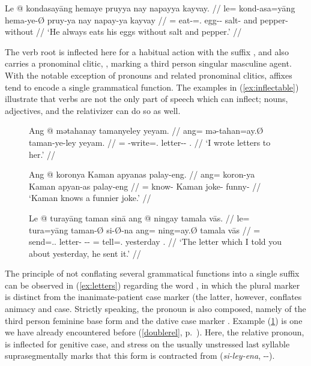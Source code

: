\ex\label{ex:suffixation}%
\begingl
	\gla Le @ kondasayāng hemaye pruyya nay napayya kayvay. //
	\glb le= kond-asa=yāng hema-ye-Ø pruy-ya nay napay-ya kayvay //
	\glc \PatTI{}= eat-\Hab{}=\TsgM{}.\Aarg{} egg-\Pl{}-\Top{} salt-\Loc{} 
		and pepper-\Loc{} without //
	\glft `He always eats his eggs without salt and pepper.' //
\endgl\xe

The verb root  is inflected here for a habitual action
with the suffix , and also carries a pronominal
clitic, , marking a third person singular
masculine agent. With the notable exception of pronouns and related pronominal
clitics, affixes tend to encode a single grammatical function. The examples in
(\ref{ex:inflectable}) illustrate that verbs are not the only part of speech
which can inflect; nouns, adjectives, and the relativizer can do
so as well.

\begin{figure}[h]
\pex\label{ex:inflectable}
\a\label{ex:letters}\begingl
	\gla Ang @ mətahanay tamanyeley yeyam. //
	\glb ang= mə-tahan=ay.Ø taman-ye-ley yeyam. //
	\glc \AgtT{}= \Pst{}-write=\Fsg{}.\Top{} letter-\Pl{}-\PargI{} 
		\TsgF{}.\Dat{} //
	\glft `I wrote letters to her.' //
\endgl

\a\label{ex:adjinfl}\begingl
	\gla Ang @ koronya Kaman apyanas palay-eng. //
	\glb ang= koron-ya Kaman apyan-as palay-eng //
	\glc \AgtT{}= know-\TsgM{} Kaman joke-\Parg{} funny-\Comp{} //
	\glft `Kaman knows a funnier joke.' //
\endgl

\a\label{ex:relative}\begingl
	\gla Le @ turayāng taman sinā ang @ ningay tamala vās. //
	\glb le= tura=yāng taman-Ø si-Ø-na ang= ning=ay.Ø tamala vās //
	\glc \PatTI{}= send=\Tsg{}.\M{}.\Aarg{} letter-\Top{} 
		\Rel{}-\PatTI{}-\Gen{} \AgtT{}= tell=\Fsg{}.\Top{} yesterday 
		\Ssg{}.\Parg{} //
	\glft `The letter which I told you about yesterday, he sent it.' //
\endgl
\xe
\end{figure}

The principle of not conflating several grammatical functions into a single
suffix can be observed in (\ref{ex:letters}) regarding the word
, in which the plural marker 
 is distinct from the inanimate-patient case marker 
 (the latter, however, conflates animacy and case. Strictly 
speaking, the pronoun  is also composed, namely of
the third person feminine base form  and the dative case marker
. Example (\ref{ex:relative}) is one we have already 
encountered before (\autoref{doublerel}, p.~\pageref{doublerel}). Here, the
relative pronoun,  is inflected for genitive
case, and stress on the usually unstressed last syllable
suprasegmentally marks that this form is
contracted from  (\textit{si-ley-ena},
\Rel{}-\PargI{}-\Gen{}).

